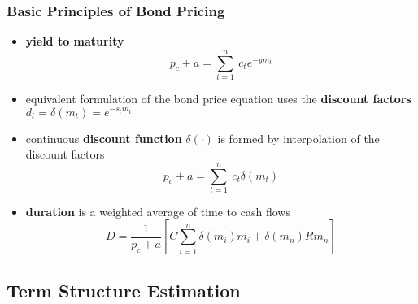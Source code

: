 \documentclass[mathserif,10pt]{beamer}
\begin{document}
\begin{frame}
\frametitle{Basic Principles of Bond Pricing}
  \begin{itemize}
\item \textcolor{craneblue}{\textbf{yield to maturity}}
\begin{equation*}
  \label{yield}
   p_c+a=\sum_{t=1}^n \ c_t e^{-ym_t}
\end{equation*}
\item  equivalent formulation of the bond price equation uses the \textcolor{craneblue}{\textbf{discount factors}} $d_t=\delta(m_t)=e^{-s_tm_t}$
\item continuous \textcolor{craneblue}{\textbf{discount function}} $\delta(\cdot)$ is formed by interpolation of the discount factors
  \begin{equation*}
  \label{bondprceq2}
    p_c+a=\sum_{t=1}^n \ c_t \delta(m_t) 
  \end{equation*}
   \item \textcolor{craneblue}{\textbf{duration}} is a weighted average of time to cash flows
  \begin{equation*}
 \label{duration} D=\frac{1}{p_c+a}\left[C\sum_{i=1}^n\delta(m_i)m_i+\delta(m_n)Rm_n\right]
\end{equation*}
\end{itemize}
\end{frame}

\subsection{Term Structure Estimation}

\end{document}
